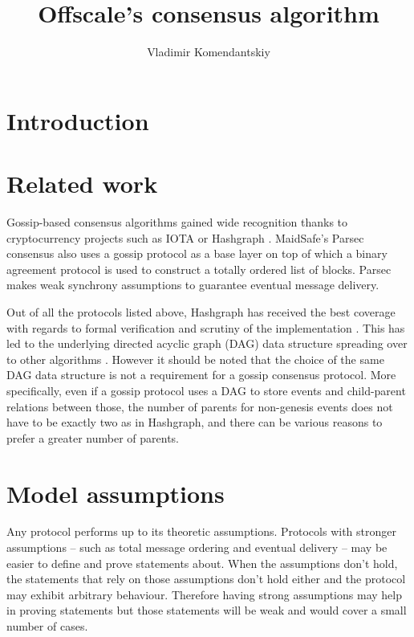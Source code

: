 \documentclass[a4paper,11pt]{article}
\title{Offscale's consensus algorithm}
\author{Vladimir Komendantskiy}
\begin{document}
\maketitle



\section{Introduction}


\section{Related work}

Gossip-based consensus algorithms gained wide recognition thanks to cryptocurrency projects such as
IOTA or Hashgraph \cite{hashgraph}. MaidSafe's Parsec \cite{parsec} consensus also uses a gossip
protocol as a base layer on top of which a binary agreement protocol is used to construct a totally
ordered list of blocks. Parsec makes weak synchrony assumptions to guarantee eventual message
delivery.

Out of all the protocols listed above, Hashgraph has received the best coverage with regards to
formal verification \cite{hashgraph-coq} and scrutiny of the implementation
\cite{hashgraph-fud}. This has led to the underlying directed acyclic graph (DAG) data structure
spreading over to other algorithms \cite{parsec, lachesis}. However it should be noted that the
choice of the same DAG data structure is not a requirement for a gossip consensus protocol. More
specifically, even if a gossip protocol uses a DAG to store events and child-parent relations
between those, the number of parents for non-genesis events does not have to be exactly two as in
Hashgraph, and there can be various reasons to prefer a greater number of parents.


\section{Model assumptions}

Any protocol performs up to its theoretic assumptions. Protocols with stronger assumptions -- such
as total message ordering and eventual delivery -- may be easier to define and prove statements
about. When the assumptions don't hold, the statements that rely on those assumptions don't hold
either and the protocol may exhibit arbitrary behaviour. Therefore having strong assumptions may
help in proving statements but those statements will be weak and would cover a small number of
cases.
\end{document}
